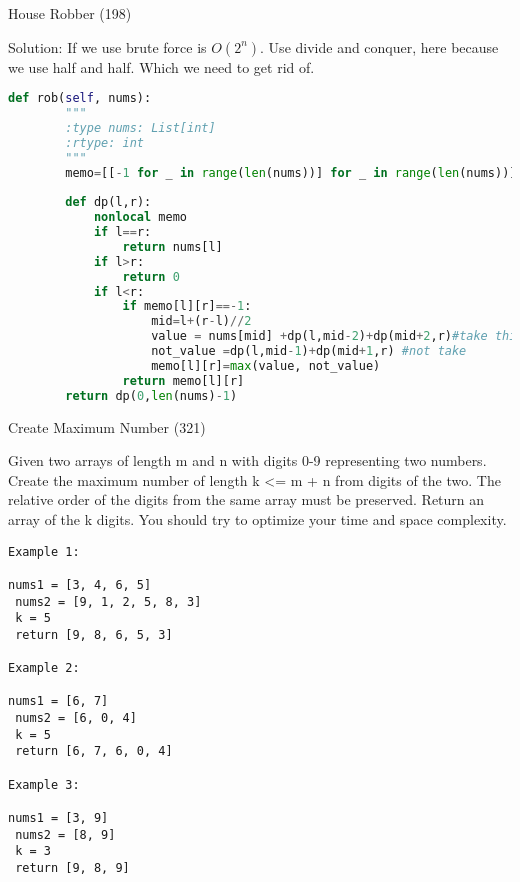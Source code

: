 \documentclass[../specific-algorithms.tex]{subfiles}
\begin{document}
\begin{examples}

    
    \item House Robber (198)
    
    Solution: If we use brute force is $O(2^n)$. Use divide and conquer, here because we use half and half. Which we need to get rid of. 
\begin{lstlisting}[language = Python]
def rob(self, nums):
        """
        :type nums: List[int]
        :rtype: int
        """
        memo=[[-1 for _ in range(len(nums))] for _ in range(len(nums))]
        
        def dp(l,r):
            nonlocal memo
            if l==r:
                return nums[l]
            if l>r:
                return 0
            if l<r:
                if memo[l][r]==-1:
                    mid=l+(r-l)//2
                    value = nums[mid] +dp(l,mid-2)+dp(mid+2,r)#take this value
                    not_value =dp(l,mid-1)+dp(mid+1,r) #not take
                    memo[l][r]=max(value, not_value)
                return memo[l][r]
        return dp(0,len(nums)-1)
\end{lstlisting}

\item Create Maximum Number (321) 

Given two arrays of length m and n with digits 0-9 representing two numbers. Create the maximum number of length k <= m + n from digits of the two. The relative order of the digits from the same array must be preserved. Return an array of the k digits. You should try to optimize your time and space complexity.
\begin{lstlisting}
Example 1:

nums1 = [3, 4, 6, 5]
 nums2 = [9, 1, 2, 5, 8, 3]
 k = 5
 return [9, 8, 6, 5, 3]

Example 2:

nums1 = [6, 7]
 nums2 = [6, 0, 4]
 k = 5
 return [6, 7, 6, 0, 4]

Example 3:

nums1 = [3, 9]
 nums2 = [8, 9]
 k = 3
 return [9, 8, 9]

\end{lstlisting}


\end{examples}
\end{document}
